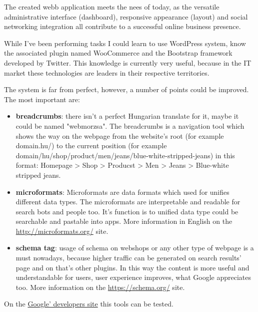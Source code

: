 
The created webb application meets the nees of today, as the versatile administrative interface (dashboard), responsive appearance (layout) and social networking integration all contribute to a successful online business presence.

While I've been performing tasks I could learn to use WordPress system, know the associated plugin named WooCommerce and the Bootstrap framework developed by Twitter. This knowledge is currently very useful, because in the IT market these technologies are leaders in their respective territories.

The system is far from perfect, however, a number of points could be improved. The most important are:

\begin{itemize}
	\item \textbf{breadcrumbs}: there isn't a perfect Hungarian translate for it, maybe it could be named "webmorzsa". The breadcrumbs is a navigation tool which shows the way on the webpage from the website's root (for example domain.hu/) to the current position (for example domain/hu/shop/product/men/jeans/blue-white-stripped-jeans) in this format: Homepage > Shop > Producst > Men > Jeans > Blue-white stripped jeans.
	\item \textbf{microformats}: Microformats are data formats which used for unifies different data types. The microformats are interpretable and readable for search bots and people too. It's function is to unified data type could be searchable and pastable into apps. More information in English on the \url{http://microformats.org/} site.
	\item \textbf{schema tag}: usage of schema on webshops or any other type of webpage is a must nowadays, because higher traffic can be generated on search results' page and on that's other plugins. In this way the content is more useful and understandable for users, user experience improves, what Google appreciates too. More information on the \url{https://schema.org/} site.
\end{itemize}

On the \href{https://developers.google.com/structured-data/testing-tool/}{Google' developers site} this tools can be tested.

\newpage

\label{Chap:melleklet}


\newpage

